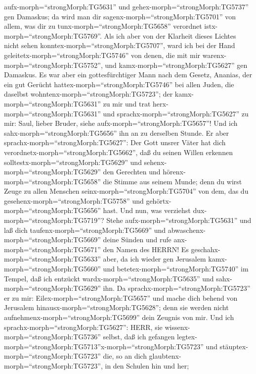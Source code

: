 aufx-morph=``strongMorph:TG5631'' und gehex-morph=``strongMorph:TG5737''
gen Damaskus; da wird man dir sagenx-morph=``strongMorph:TG5701'' von
allem, was dir zu tunx-morph=``strongMorph:TG5658'' verordnet
istx-morph=``strongMorph:TG5769''.  Als ich aber von der
Klarheit dieses Lichtes nicht sehen
konntex-morph=``strongMorph:TG5707'', ward ich bei der Hand
geleitetx-morph=``strongMorph:TG5746'' von denen, die mit mir
warenx-morph=``strongMorph:TG5752'', und
kamx-morph=``strongMorph:TG5627'' gen Damaskus.  Es war
aber ein gottesfürchtiger Mann nach dem Gesetz, Ananias, der ein gut
Gerücht hattex-morph=``strongMorph:TG5746'' bei allen Juden, die
daselbst wohntenx-morph=``strongMorph:TG5723'';  der
kamx-morph=``strongMorph:TG5631'' zu mir und trat
herx-morph=``strongMorph:TG5631'' und
sprachx-morph=``strongMorph:TG5627'' zu mir: Saul, lieber Bruder, siehe
aufx-morph=``strongMorph:TG5657''! Und ich
sahx-morph=``strongMorph:TG5656'' ihn an zu derselben Stunde.
 Er aber sprachx-morph=``strongMorph:TG5627'': Der Gott
unsrer Väter hat dich verordnetx-morph=``strongMorph:TG5662'', daß du
seinen Willen erkennen solltestx-morph=``strongMorph:TG5629'' und
sehenx-morph=``strongMorph:TG5629'' den Gerechten und
hörenx-morph=``strongMorph:TG5658'' die Stimme aus seinem Munde;
 denn du wirst Zeuge zu allen Menschen
seinx-morph=``strongMorph:TG5704'' von dem, das du
gesehenx-morph=``strongMorph:TG5758'' und
gehörtx-morph=``strongMorph:TG5656'' hast.  Und nun, was
verziehst dux-morph=``strongMorph:TG5719''? Stehe
aufx-morph=``strongMorph:TG5631'' und laß dich
taufenx-morph=``strongMorph:TG5669'' und
abwaschenx-morph=``strongMorph:TG5669'' deine Sünden und rufe
anx-morph=``strongMorph:TG5671'' den Namen des HERRN!  Es
geschahx-morph=``strongMorph:TG5633'' aber, da ich wieder gen Jerusalem
kamx-morph=``strongMorph:TG5660'' und
betetex-morph=``strongMorph:TG5740'' im Tempel, daß ich entzückt
wardx-morph=``strongMorph:TG5635'' und sahx-morph=``strongMorph:TG5629''
ihn.  Da sprachx-morph=``strongMorph:TG5723'' er zu mir:
Eilex-morph=``strongMorph:TG5657'' und mache dich behend von Jerusalem
hinausx-morph=``strongMorph:TG5628''; denn sie werden nicht
aufnehmenx-morph=``strongMorph:TG5699'' dein Zeugnis von mir.
 Und ich sprachx-morph=``strongMorph:TG5627'': HERR, sie
wissenx-morph=``strongMorph:TG5736'' selbst, daß ich gefangen
legtex-morph=``strongMorph:TG5713''x-morph=``strongMorph:TG5723'' und
stäuptex-morph=``strongMorph:TG5723'' die, so an dich
glaubtenx-morph=``strongMorph:TG5723'', in den Schulen hin und her;
